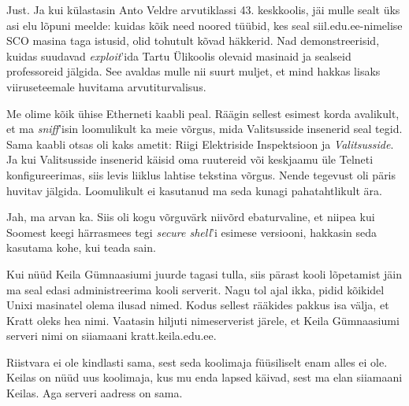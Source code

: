 
Just. Ja kui külastasin Anto 
Veldre arvutiklassi 43. 
keskkoolis, jäi mulle sealt üks asi elu 
lõpuni meelde: kuidas kõik need noored tüübid, kes seal 
siil.edu.ee-nimelise SCO masina 
taga istusid, olid tohutult kõvad häkkerid. Nad demonstreerisid,
kuidas suudavad \emph{exploit}'ida Tartu 
Ülikoolis olevaid masinaid\label{sisu!ylikooli_root} ja sealseid professoreid jälgida. See 
avaldas mulle nii suurt muljet, et mind hakkas lisaks 
viiruseteemale huvitama arvutiturvalisus.

Me olime kõik ühise Etherneti kaabli peal. Räägin sellest esimest korda avalikult, et ma 
\emph{sniff}'isin loomulikult ka meie võrgus, mida 
Valitsusside insenerid seal tegid. Sama kaabli otsas oli kaks ametit: Riigi Elektriside 
Inspektsioon ja 
\emph{Valitsusside}. Ja kui Valitsusside insenerid käisid oma ruutereid või 
keskjaamu üle Telneti konfigureerimas, siis levis liiklus lahtise 
tekstina võrgus. Nende tegevust oli päris huvitav jälgida. 
Loomulikult ei kasutanud ma seda kunagi pahatahtlikult ära.


Jah, ma arvan ka. Siis oli kogu võrguvärk 
niivõrd ebaturvaline, et niipea kui Soomest keegi härrasmees tegi 
\emph{secure shell}'i esimese versiooni, hakkasin seda kasutama kohe, kui teada sain. 

Kui nüüd Keila Gümnaasiumi juurde tagasi tulla, siis 
pärast kooli lõpetamist jäin ma seal edasi 
administreerima kooli serverit. Nagu tol ajal ikka, pidid 
kõikidel Unixi masinatel olema ilusad nimed. Kodus sellest rääkides pakkus 
isa välja, et Kratt oleks hea nimi. 
Vaatasin hiljuti nimeserverist järele, et Keila Gümnaasiumi serveri 
nimi on siiamaani kratt.keila.edu.ee.


Riistvara ei ole kindlasti sama, sest seda koolimaja füüsiliselt enam alles 
ei ole. Keilas on nüüd uus koolimaja, kus mu enda lapsed käivad, sest ma elan 
siiamaani Keilas. Aga serveri aadress on sama.

